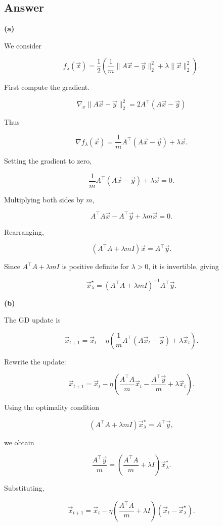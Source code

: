 \documentclass[
  12pt,
]{fphw}
\begin{document}
\subsection*{Answer}

\textbf{(a)}

We consider

\[
f_\lambda(\vec{x})= \frac12 \left( \frac1m\|A\vec{x}-\vec{y}\|_2^2 + \lambda\|\vec{x}\|_2^2 \right).
\]

First compute the gradient.

\[
\nabla_x \|A\vec{x}-\vec{y}\|_2^2 = 2A^\top(A\vec{x}-\vec{y})
\]

Thus

\[
\nabla f_\lambda(\vec{x}) = \frac{1}{m}A^\top(A\vec{x}-\vec{y})+\lambda \vec{x}.
\]

Setting the gradient to zero,

\[
\frac1mA^\top(A\vec{x}-\vec{y})+\lambda\vec{x}=0.
\]

Multiplying both sides by \(m\),

\[
A^\top A\vec{x}-A^\top\vec{y}+\lambda m\vec{x}=0.
\]

Rearranging,

\[
(A^\top A+\lambda mI)\vec{x}=A^\top\vec{y}.
\]

Since \(A^\top A+\lambda mI\) is positive definite for \(\lambda>0\), it is invertible, giving

\[
\vec{x}_\lambda^\star
=
(A^\top A+\lambda mI)^{-1}A^\top\vec{y}.
\]

\textbf{(b)}

The GD update is

\[
\vec{x}_{t+1}
=
\vec{x}_t
-
\eta
\left(
\frac1mA^\top(A\vec{x}_t-\vec{y})
+
\lambda\vec{x}_t
\right).
\]

Rewrite the update:

\[
\vec{x}_{t+1}
=
\vec{x}_t
-
\eta
\left(
\frac{A^\top A}{m}\vec{x}_t
-
\frac{A^\top \vec{y}}{m}
+
\lambda \vec{x}_t
\right).
\]

Using the optimality condition

\[
(A^\top A+\lambda mI)\vec{x}_\lambda^\star
=
A^\top\vec{y},
\]

we obtain

\[
\frac{A^\top\vec{y}}{m}
=
\left(\frac{A^\top A}{m}+\lambda I\right)\vec{x}_\lambda^\star.
\]

Substituting,

\[
\vec{x}_{t+1}
=
\vec{x}_t
-
\eta
\left(\frac{A^\top A}{m}+\lambda I\right)
(\vec{x}_t-\vec{x}_\lambda^\star).
\]
\end{document}
